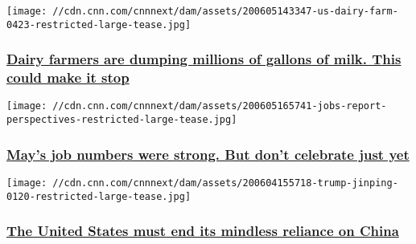 \href{/2020/06/08/perspectives/cabot-dairy-farmers-pandemic/index.html}{}

\texttt{[image: //cdn.cnn.com/cnnnext/dam/assets/200605143347-us-dairy-farm-0423-restricted-large-tease.jpg]}

\hypertarget{dairy-farmers-are-dumping-millions-of-gallons-of-milk-this-could-make-it-stop}{%
\subsubsection{\texorpdfstring{\href{/2020/06/08/perspectives/cabot-dairy-farmers-pandemic/index.html}{Dairy
farmers are dumping millions of gallons of milk. This could make it
stop}}{Dairy farmers are dumping millions of gallons of milk. This could make it stop}}\label{dairy-farmers-are-dumping-millions-of-gallons-of-milk-this-could-make-it-stop}}

\href{/2020/06/06/perspectives/jobs-report-may/index.html}{}

\texttt{[image: //cdn.cnn.com/cnnnext/dam/assets/200605165741-jobs-report-perspectives-restricted-large-tease.jpg]}

\hypertarget{mays-job-numbers-were-strong-but-dont-celebrate-just-yet}{%
\subsubsection{\texorpdfstring{\href{/2020/06/06/perspectives/jobs-report-may/index.html}{May's
job numbers were strong. But don't celebrate just
yet}}{May's job numbers were strong. But don't celebrate just yet}}\label{mays-job-numbers-were-strong-but-dont-celebrate-just-yet}}

\href{/2020/06/05/perspectives/united-states-reliance-china/index.html}{}

\texttt{[image: //cdn.cnn.com/cnnnext/dam/assets/200604155718-trump-jinping-0120-restricted-large-tease.jpg]}

\hypertarget{the-united-states-must-end-its-mindless-reliance-on-china}{%
\subsubsection{\texorpdfstring{\href{/2020/06/05/perspectives/united-states-reliance-china/index.html}{The
United States must end its mindless reliance on
China}}{The United States must end its mindless reliance on China}}\label{the-united-states-must-end-its-mindless-reliance-on-china}}

\href{/2020/06/04/perspectives/caregivers-reopen-offices/index.html}{}

